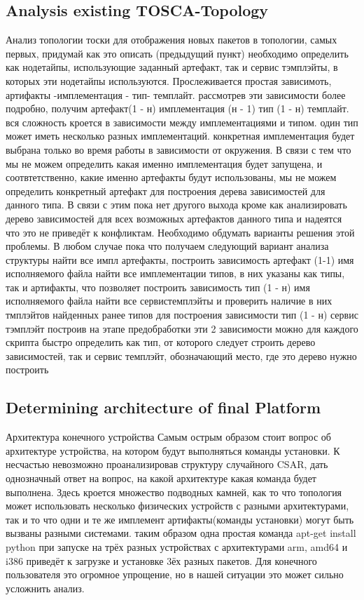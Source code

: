 \fi
\subsection*{Analysis existing TOSCA-Topology}
Анализ топологии тоски
для отображения новых пакетов в топологии, самых первых, придумай как это описать (предыдущий пункт) необходимо определить как нодетайпы, использующие заданный артефакт, так и сервис тэмплэйты, в которых эти нодетайпы используются.
Прослеживается простая зависимоть, артифакты -имплементация - тип- темплайт. рассмотрев эти зависимости более подробно, получим  артефакт(1 - н) имплементация (н - 1) тип (1 - н) темплайт.
вся сложность кроется в зависимости между имплементациями и типом. один тип может иметь несколько разных имплементаций. конкретная имплементация будет выбрана только во время работы в зависимости от окружения. В связи с тем что мы не можем определить какая именно имплементация будет запущена, и соотвтетственно, какие именно артефакты будут использованы, мы не можем определить конкретный артефакт для построения дерева зависимостей для данного типа. В связи с этим пока нет другого выхода кроме как анализировать дерево зависимостей для всех возможных артефактов данного типа и надеятся что это не приведёт к конфликтам. Необходимо обдумать варианты решения этой проблемы.
В любом случае пока что получаем следующий вариант анализа структуры
найти все импл артефакты, построить зависимость артефакт (1-1) имя исполняемого файла
найти все имплементации типов, в них указаны как типы, так и артифакты, что позволяет построить зависимость тип (1 - н) имя исполняемого файла
найти все сервистемплэйты и проверить наличие в них тмплэйтов найденных ранее типов для построения зависимости тип (1 - н) сервис тэмплэйт
построив на этапе предобработки эти 2 зависимости можно для каждого скрипта быстро определить как тип, от которого следует строить дерево зависимостей, так и сервис темплэйт, обозначающий место, где это дерево нужно построить

\fi
\subsection*{Determining architecture of final Platform}
Архитектура конечного устройства
Самым острым образом стоит вопрос об архитектуре устройства, на котором будут выполняться команды установки. 
К несчастью невозможно проанализировав структуру случайного CSAR, дать однозначный ответ на вопрос, на какой архитектуре какая команда будет выполнена. Здесь кроется множество подводных камней, как то что топология может использовать несколько физических устройств с разными архитектурами, так и то что одни и те же имплемент артифакты(команды установки) могут быть вызваны разными системами. таким образом одна простая команда apt-get install python при запуске на трёх разных устройствах с архитектурами arm, amd64 и i386 приведёт к загрузке и установке 3ёх разных пакетов. Для конечного пользователя это огромное упрощение, но в нашей ситуации это может сильно усложнить анализ.

